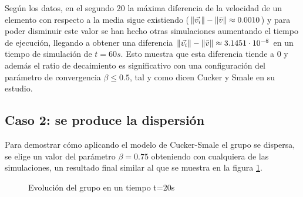 Según los datos, en el segundo 20 la máxima diferencia de la velocidad de un elemento con respecto a la media sigue existiendo ($\|\vec{v_i}\|-\|\Bar{v}\| \approx 0.0010$) y para poder disminuir este valor se han hecho otras simulaciones aumentando el tiempo de ejecución, llegando  a obtener una diferencia $\|\vec{v_i}\|-\|\Bar{v}\| \approx 3.1451\cdot10^{-8}$ en un tiempo de simulación de $t=60s$. Esto muestra que esta diferencia tiende a 0 y además el ratio de decaimiento es significativo con una configuración del parámetro de convergencia $\beta\leq0.5$, tal y como dicen Cucker y Smale en su estudio. 

\subsection{Caso 2: se produce la dispersión} \label{s4_3_2}
Para demostrar cómo aplicando el modelo de Cucker-Smale el grupo se dispersa, se elige un valor del parámetro $\beta = 0.75$ obteniendo con cualquiera de las simulaciones, un resultado final similar al que se muestra en la figura \ref{fig:CS075_pos}.

\begin{figure}[htbp]
\centering
\caption{Evolución del grupo en un tiempo t=20s} 
\label{fig:CS075_pos}
\end{figure}

